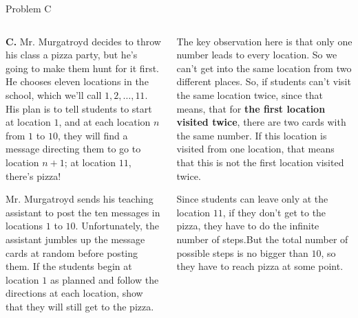 \documentclass[9pt,aspectratio=169]{beamer}
\begin{document}
\begin{frame}{Problem C}
  \begin{columns}[T]
    \begin{column}{0.5\textwidth}
      \begin{problem}
        \textbf{C.} Mr. Murgatroyd decides to throw his class a pizza party, but he's going to make them hunt for it first. He chooses eleven locations in the school, which we'll call $1, 2, \ldots, 11$. His plan is to tell students to start at location $1$, and at each location $n$ from $1$ to $10$, they will find a message directing them to go to location $n+1$; at location $11$, there's pizza!

        Mr. Murgatroyd sends his teaching assistant to post the ten messages in locations $1$ to $10$. Unfortunately, the assistant jumbles up the message cards at random before posting them. If the students begin at location $1$ as planned and follow the directions at each location, show that they will still get to the pizza.
      \end{problem}
      \pause
    \end{column}
    \begin{column}{0.5\textwidth}
      The key observation here is that only one number leads to every location. \pause So we can't get into the same location from two different places. \pause So, if students can't visit the same location twice, since that means, that for \textbf{the first location visited twice}, there are two cards with the same number. \pause If this location is visited from one location, that means that this is not the first location visited twice.
      \pause

      Since students can leave only at the location $11$, if they don't get to the pizza, they have to do the infinite number of steps.\pause But the total number of possible steps is no bigger than $10$, so they have to reach pizza at some point.
    \end{column}
  \end{columns}
\end{frame}
\end{document}
